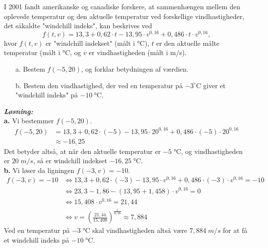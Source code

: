 \documentclass{article}
\newcommand{\sol}{\setlength{\parindent}{0cm}\textbf{\textit{Løsning:}}\setlength{\parindent}{1cm}}
\begin{document}
\begin{question}{}{}
 I 2001 fandt amerikanske og canadiske forskere, at sammenhængen mellem den oplevede temperatur og den aktuelle temperatur ved forskellige vindhastigheder, det såkaldte "windchill indeks", kan beskrives ved
$$f(t,v)=13,3+0,62\cdot t-13,95\cdot v^{0,16}+0,486\cdot t\cdot v^{0,16},$$
  hvor $f(t,v)$ er "windchill indekset" (målt i °C), $t$ er den aktuelle målte temperatur (målt i $\unit{\celsius}$, og $v$ er vindhastigheden (målt i m/s).
  \begin{itemize}
    \item[a.] Bestem $f(-5,20)$, og forklar betydningen af værdien.
    \item[b.] Bestem den vindhastighed, der ved en temperatur på $-3^{\circ}$C giver et "windchill indeks" på $-10 \;\unit{\celsius} $.
  \end{itemize}
\end{question}
\sol \\
\textbf{a.}
Vi bestemmer $f(-5,20)$.
\begin{equation*}
\begin{split}
  f(-5,20)&=13,3 + 0,62 \cdot \left(-5\right) -13,95 \cdot 20 ^{0,16}+0,486 \cdot \left(-5\right) \cdot 20 ^{0,16}\\
  &\approx -16,25
\end{split}
\end{equation*}
Det betyder altså, at når den aktuelle temperatur er $-5 \;\unit{\celsius} $, og vindhastigheden er $20 \;\unit{m/s} $, så er windchill indekset $-16,25 \;\unit{\celsius} $.\\[1ex]
\textbf{b.}
Vi løser da ligningen $f(-3,v)= -10$.
\begin{equation*}
\begin{split}
  f(-3,v)= -10 &\iff 13,3+0,62 \cdot \left(-3\right) - 13,95 \cdot v ^{0,16}+0,486 \cdot \left(-3\right) \cdot v ^{0,16}=-10\\
  &\iff 23,3 -1,86 - \left(13,95+1,458\right) \cdot v ^{0,16}=0\\
  &\iff 15,408 \cdot v ^{0,16}=21,44\\
  &\iff v=\left(\frac{21,44}{15,408}\right)^{\frac{1}{0,16}} \approx 7,884
\end{split}
\end{equation*}
Ved en temperatur på $-3 \;\unit{\celsius} $ skal vindhastigheden altså være $7,884 \;\unit{m/s} $ for at få et windchill indeks på $-10 \;\unit{\celsius} $. 
\end{document}

